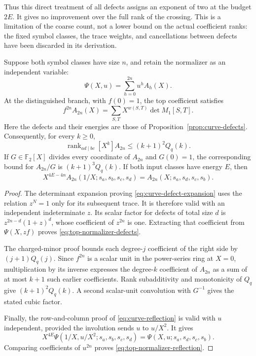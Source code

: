 Thus this direct treatment of all defects assigns an exponent of two at the budget $2E$. It gives no improvement over the full rank of the crossing. This is a limitation of the coarse count, not a lower bound on the actual coefficient ranks: the fixed symbol classes, the trace weights, and cancellations between defects have been discarded in its derivation.

\begin{proposition}\label{prop:top-normalizer-coefficient}
Suppose both symbol classes have size $n$, and retain the normalizer as an independent variable:
\[
 \Psi(X,u)=\sum_{h=0}^{2n}u^h A_h(X).
\]
At the distinguished branch, with $f(0)=1$, the top coefficient satisfies
\begin{equation}\label{eq:top-normalizer-defects}
 f^{2n}A_{2n}(X)
 =\sum_{S,T}X^{w(S,T)}\det M_1[S,T].
\end{equation}
Here the defects and their energies are those of Proposition~\ref{prop:curve-defects}. Consequently, for every $k\geq0$,
\[
 \operatorname{rank}_{ad\mid bc}[X^k]A_{2n}
 \leq(k+1)^2Q_q(k).
\]
If $G\in\mathbb F_2[X]$ divides every coordinate of $A_{2n}$ and $G(0)=1$, the corresponding bound for $A_{2n}/G$ is $(k+1)^3Q_q(k)$. If both input classes have energy $E$, then
\begin{equation}\label{eq:top-normalizer-reflection}
 X^{4E-4n}A_{2n}(1/X;s_a,s_b,s_c,s_d)
 =A_{2n}(X;s_a,s_d,s_c,s_b).
\end{equation}
\end{proposition}
\begin{proof}
The determinant expansion proving \eqref{eq:curve-defect-expansion} uses the relation $z^N=1$ only for its subsequent trace. It is therefore valid with an independent indeterminate $z$. Its scalar factor for defects of total size $d$ is $z^{2n-d}(1+z)^d$, whose coefficient of $z^{2n}$ is one. Extracting that coefficient from $\Psi(X,zf)$ proves \eqref{eq:top-normalizer-defects}.

The charged-minor proof bounds each degree-$j$ coefficient of the right side by $(j+1)Q_q(j)$. Since $f^{2n}$ is a scalar unit in the power-series ring at $X=0$, multiplication by its inverse expresses the degree-$k$ coefficient of $A_{2n}$ as a sum of at most $k+1$ such earlier coefficients. Rank subadditivity and monotonicity of $Q_q$ give $(k+1)^2Q_q(k)$. A second scalar-unit convolution with $G^{-1}$ gives the stated cubic factor.

Finally, the row-and-column proof of \eqref{eq:curve-reflection} is valid with $u$ independent, provided the involution sends $u$ to $u/X^2$. It gives
\[
 X^{4E}\Psi(1/X,u/X^2;s_a,s_b,s_c,s_d)
 =\Psi(X,u;s_a,s_d,s_c,s_b).
\]
Comparing coefficients of $u^{2n}$ proves \eqref{eq:top-normalizer-reflection}.
\end{proof}

